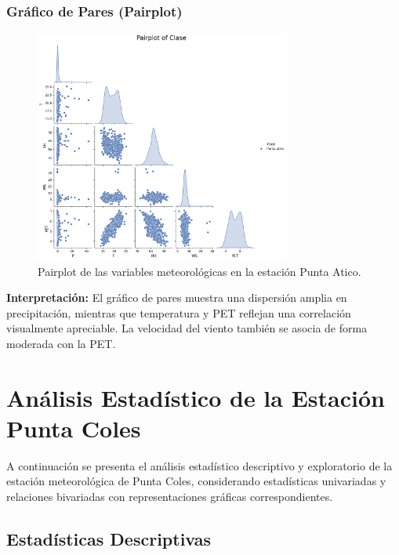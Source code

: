 \subsubsection*{Gráfico de Pares (Pairplot)}
\begin{figure}[htbp]
\centering
\includegraphics[width=0.75\textwidth]{resultados/por_estacion_meteorologica/Punta_Atico/pairplot.png}
\caption{Pairplot de las variables meteorológicas en la estación Punta Atico.}
\label{fig:punta_atico_pairplot}
\end{figure}
\textbf{Interpretación:} El gráfico de pares muestra una dispersión amplia en precipitación, mientras que temperatura y PET reflejan una correlación visualmente apreciable. La velocidad del viento también se asocia de forma moderada con la PET.




\section{Análisis Estadístico de la Estación Punta Coles}

A continuación se presenta el análisis estadístico descriptivo y exploratorio de la estación meteorológica de Punta Coles, considerando estadísticas univariadas y relaciones bivariadas con representaciones gráficas correspondientes.

\subsection{Estadísticas Descriptivas}

